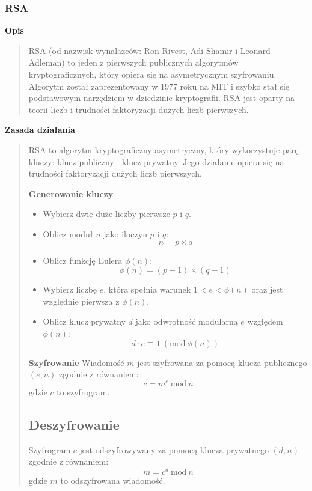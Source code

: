 \documentclass[12pt,a4paper]{article}
\begin{document}
\subsubsection{RSA}
\noindent\textbf{Opis}
\begin{quotation}\noindent RSA (od nazwisk wynalazców: Ron Rivest, Adi Shamir i Leonard Adleman) to jeden z pierwszych publicznych algorytmów kryptograficznych, który opiera się na asymetrycznym szyfrowaniu. Algorytm został zaprezentowany w 1977 roku na MIT i szybko stał się podstawowym narzędziem w dziedzinie kryptografii. RSA jest oparty na teorii liczb i trudności faktoryzacji dużych liczb pierwszych.
\end{quotation}

\noindent\textbf{Zasada działania}
\begin{quotation}\noindent RSA to algorytm kryptograficzny asymetryczny, który wykorzystuje parę kluczy: klucz publiczny i klucz prywatny. Jego działanie opiera się na trudności faktoryzacji dużych liczb pierwszych.

\noindent\textbf{Generowanie kluczy}
\begin{itemize}
    \item Wybierz dwie duże liczby pierwsze \( p \) i \( q \).
    \item Oblicz moduł \( n \) jako iloczyn \( p \) i \( q \):
    \[
    n = p \times q
    \]
    \item Oblicz funkcję Eulera \( \phi(n) \):
    \[
    \phi(n) = (p - 1) \times (q - 1)
    \]
    \item Wybierz liczbę \( e \), która spełnia warunek \( 1 < e < \phi(n) \) oraz jest względnie pierwsza z \( \phi(n) \).
    \item Oblicz klucz prywatny \( d \) jako odwrotność modularną \( e \) względem \( \phi(n) \):
    \[
    d \cdot e \equiv 1 \ (\text{mod} \ \phi(n))
    \]
\end{itemize}

\noindent\textbf{Szyfrowanie}
Wiadomość \( m \) jest szyfrowana za pomocą klucza publicznego \( (e, n) \) zgodnie z równaniem:
\[
c = m^e \ \text{mod} \ n
\]
gdzie \( c \) to szyfrogram.

\subsection*{Deszyfrowanie}
Szyfrogram \( c \) jest odszyfrowywany za pomocą klucza prywatnego \( (d, n) \) zgodnie z równaniem:
\[
m = c^d \ \text{mod} \ n
\]
gdzie \( m \) to odszyfrowana wiadomość.

\end{quotation}
\end{document}
